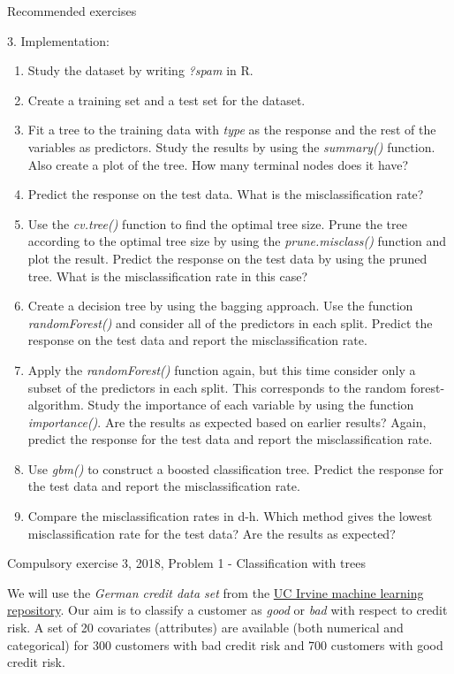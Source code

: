 \documentclass[ignorenonframetext,]{beamer}
\begin{document}
\begin{frame}[fragile]{Recommended exercises}
\begin{block}{3. Implementation:}
\begin{enumerate}
\def\labelenumi{\alph{enumi})}
\item
  Study the dataset by writing \emph{?spam} in R.
\item
  Create a training set and a test set for the dataset.
\item
  Fit a tree to the training data with \emph{type} as the response and
  the rest of the variables as predictors. Study the results by using
  the \emph{summary()} function. Also create a plot of the tree. How
  many terminal nodes does it have?
\item
  Predict the response on the test data. What is the misclassification
  rate?
\item
  Use the \emph{cv.tree()} function to find the optimal tree size. Prune
  the tree according to the optimal tree size by using the
  \emph{prune.misclass()} function and plot the result. Predict the
  response on the test data by using the pruned tree. What is the
  misclassification rate in this case?
\item
  Create a decision tree by using the bagging approach. Use the function
  \emph{randomForest()} and consider all of the predictors in each
  split. Predict the response on the test data and report the
  misclassification rate.
\item
  Apply the \emph{randomForest()} function again, but this time consider
  only a subset of the predictors in each split. This corresponds to the
  random forest-algorithm. Study the importance of each variable by
  using the function \emph{importance()}. Are the results as expected
  based on earlier results? Again, predict the response for the test
  data and report the misclassification rate.
\item
  Use \emph{gbm()} to construct a boosted classification tree. Predict
  the response for the test data and report the misclassification rate.
\item
  Compare the misclassification rates in d-h. Which method gives the
  lowest misclassification rate for the test data? Are the results as
  expected?
\end{enumerate}

\end{block}

\begin{block}{Compulsory exercise 3, 2018, Problem 1 - Classification
with trees}

We will use the \emph{German credit data set} from the
\href{https://archive.ics.uci.edu/ml/index.php}{UC Irvine machine
learning repository}. Our aim is to classify a customer as \emph{good}
or \emph{bad} with respect to credit risk. A set of 20 covariates
(attributes) are available (both numerical and categorical) for 300
customers with bad credit risk and 700 customers with good credit risk.


\end{block}
\end{frame}
\end{document}
